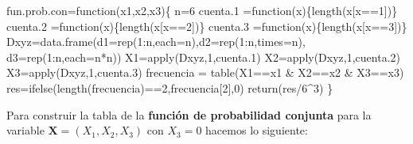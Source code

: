 \documentclass[
  letterpaper,
  DIV=11,
  numbers=noendperiod]{scrreprt}
\newenvironment{Shaded}{\begin{snugshade}}{\end{snugshade}}
\newcommand{\AttributeTok}[1]{\textcolor[rgb]{0.40,0.45,0.13}{#1}}
\newcommand{\ControlFlowTok}[1]{\textcolor[rgb]{0.00,0.23,0.31}{#1}}
\newcommand{\DecValTok}[1]{\textcolor[rgb]{0.68,0.00,0.00}{#1}}
\newcommand{\FloatTok}[1]{\textcolor[rgb]{0.68,0.00,0.00}{#1}}
\newcommand{\FunctionTok}[1]{\textcolor[rgb]{0.28,0.35,0.67}{#1}}
\newcommand{\NormalTok}[1]{\textcolor[rgb]{0.00,0.23,0.31}{#1}}
\newcommand{\OtherTok}[1]{\textcolor[rgb]{0.00,0.23,0.31}{#1}}
\newcommand{\SpecialCharTok}[1]{\textcolor[rgb]{0.37,0.37,0.37}{#1}}
\begin{document}
\begin{Shaded}
\begin{Highlighting}[]
\NormalTok{fun.prob.con}\OtherTok{=}\ControlFlowTok{function}\NormalTok{(x1,x2,x3)\{}
\NormalTok{  n}\OtherTok{=}\DecValTok{6}
\NormalTok{  cuenta}\FloatTok{.1} \OtherTok{=}\ControlFlowTok{function}\NormalTok{(x)\{}\FunctionTok{length}\NormalTok{(x[x}\SpecialCharTok{==}\DecValTok{1}\NormalTok{])\}}
\NormalTok{  cuenta}\FloatTok{.2} \OtherTok{=}\ControlFlowTok{function}\NormalTok{(x)\{}\FunctionTok{length}\NormalTok{(x[x}\SpecialCharTok{==}\DecValTok{2}\NormalTok{])\}}
\NormalTok{  cuenta}\FloatTok{.3} \OtherTok{=}\ControlFlowTok{function}\NormalTok{(x)\{}\FunctionTok{length}\NormalTok{(x[x}\SpecialCharTok{==}\DecValTok{3}\NormalTok{])\}}
\NormalTok{  Dxyz}\OtherTok{=}\FunctionTok{data.frame}\NormalTok{(}\AttributeTok{d1=}\FunctionTok{rep}\NormalTok{(}\DecValTok{1}\SpecialCharTok{:}\NormalTok{n,}\AttributeTok{each=}\NormalTok{n),}\AttributeTok{d2=}\FunctionTok{rep}\NormalTok{(}\DecValTok{1}\SpecialCharTok{:}\NormalTok{n,}\AttributeTok{times=}\NormalTok{n),}
                  \AttributeTok{d3=}\FunctionTok{rep}\NormalTok{(}\DecValTok{1}\SpecialCharTok{:}\NormalTok{n,}\AttributeTok{each=}\NormalTok{n}\SpecialCharTok{*}\NormalTok{n))}
\NormalTok{  X1}\OtherTok{=}\FunctionTok{apply}\NormalTok{(Dxyz,}\DecValTok{1}\NormalTok{,cuenta}\FloatTok{.1}\NormalTok{)}
\NormalTok{  X2}\OtherTok{=}\FunctionTok{apply}\NormalTok{(Dxyz,}\DecValTok{1}\NormalTok{,cuenta}\FloatTok{.2}\NormalTok{)}
\NormalTok{  X3}\OtherTok{=}\FunctionTok{apply}\NormalTok{(Dxyz,}\DecValTok{1}\NormalTok{,cuenta}\FloatTok{.3}\NormalTok{)}
\NormalTok{  frecuencia }\OtherTok{=} \FunctionTok{table}\NormalTok{(X1}\SpecialCharTok{==}\NormalTok{x1 }\SpecialCharTok{\&}\NormalTok{ X2}\SpecialCharTok{==}\NormalTok{x2 }\SpecialCharTok{\&}\NormalTok{ X3}\SpecialCharTok{==}\NormalTok{x3)}
\NormalTok{  res}\OtherTok{=}\FunctionTok{ifelse}\NormalTok{(}\FunctionTok{length}\NormalTok{(frecuencia)}\SpecialCharTok{==}\DecValTok{2}\NormalTok{,frecuencia[}\DecValTok{2}\NormalTok{],}\DecValTok{0}\NormalTok{)}
  \FunctionTok{return}\NormalTok{(res}\SpecialCharTok{/}\DecValTok{6}\SpecialCharTok{\^{}}\DecValTok{3}\NormalTok{)}
\NormalTok{\}}
\end{Highlighting}
\end{Shaded}

Para construir la tabla de la \textbf{función de probabilidad conjunta}
para la variable \(\mathbf{X}=(X_1,X_2,X_3)\) con \(X_3=0\) hacemos lo
siguiente:
\end{document}
